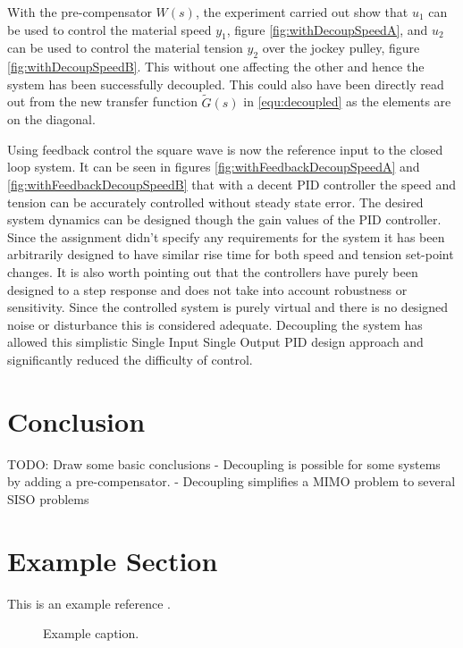 \documentclass[a4paper, titlepage]{article}
\begin{document}
With the pre-compensator $W(s)$, the experiment carried out show that $u_1$ can be used to control the material speed $y_1$, figure \ref{fig:withDecoupSpeedA}, and $u_2$ can be used to control the material tension $y_2$ over the jockey pulley, figure \ref{fig:withDecoupSpeedB}.
This without one affecting the other and hence the system has been successfully decoupled.
This could also have been directly read out from the new transfer function $\tilde{G}(s)$ in \ref{equ:decoupled} as the elements are on the diagonal.

Using feedback control the square wave is now the reference input to the closed loop system.
It can be seen in figures \ref{fig:withFeedbackDecoupSpeedA} and \ref{fig:withFeedbackDecoupSpeedB} that with a decent PID controller the speed and tension can be accurately controlled without steady state error.
The desired system dynamics can be designed though the gain values of the PID controller.
Since the assignment didn't specify any requirements for the system it has been arbitrarily designed to have similar rise time for both speed and tension set-point changes.
It is also worth pointing out that the controllers have purely been designed to a step response and does not take into account robustness or sensitivity.
Since the controlled system is purely virtual and there is no designed noise or disturbance this is considered adequate.
Decoupling the system has allowed this simplistic Single Input Single Output PID design approach and significantly reduced the difficulty of control.

\section{Conclusion}
TODO: Draw some basic conclusions
- Decoupling is possible for some systems by adding a pre-compensator.
- Decoupling simplifies a MIMO problem to several SISO problems



\clearpage


\clearpage
\appendix

\section{Example Section}
This is an example reference \citep{glad00}.

\begin{figure}[h!]
\center
\caption{Example caption.}
\label{fig:exampleLable}
\end{figure}


\end{document}
